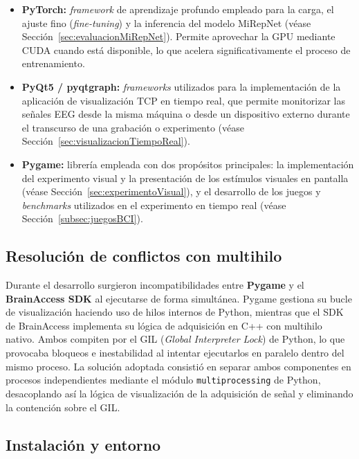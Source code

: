 \begin{itemize}
\item \textbf{PyTorch:} \textit{framework} de aprendizaje profundo empleado para la carga, el ajuste fino (\textit{fine-tuning}) y la inferencia del modelo MiRepNet (véase Sección~\ref{sec:evaluacionMiRepNet}). Permite aprovechar la GPU mediante CUDA cuando está disponible, lo que acelera significativamente el proceso de entrenamiento.

\item \textbf{PyQt5 / pyqtgraph:} \textit{frameworks} utilizados para la implementación de la aplicación de visualización TCP en tiempo real, que permite monitorizar las señales EEG desde la misma máquina o desde un dispositivo externo durante el transcurso de una grabación o experimento (véase Sección~\ref{sec:visualizacionTiempoReal}).

\item \textbf{Pygame:} librería empleada con dos propósitos principales: la implementación del experimento visual y la presentación de los estímulos visuales en pantalla (véase Sección~\ref{sec:experimentoVisual}), y el desarrollo de los juegos y \textit{benchmarks} utilizados en el experimento en tiempo real (véase Sección~\ref{subsec:juegosBCI}).

\end{itemize}

\subsection{Resolución de conflictos con multihilo}
\label{subsec:multithread}

Durante el desarrollo surgieron incompatibilidades entre \textbf{Pygame} y el \textbf{BrainAccess SDK} al ejecutarse de forma simultánea. Pygame gestiona su bucle de visualización haciendo uso de hilos internos de Python, mientras que el SDK de BrainAccess implementa su lógica de adquisición en C++ con multihilo nativo. Ambos compiten por el GIL (\textit{Global Interpreter Lock}) de Python, lo que provocaba bloqueos e inestabilidad al intentar ejecutarlos en paralelo dentro del mismo proceso. La solución adoptada consistió en separar ambos componentes en procesos independientes mediante el módulo \texttt{multiprocessing} de Python, desacoplando así la lógica de visualización de la adquisición de señal y eliminando la contención sobre el GIL.

\subsection{Instalación y entorno}
\label{subsec:instalacion}

